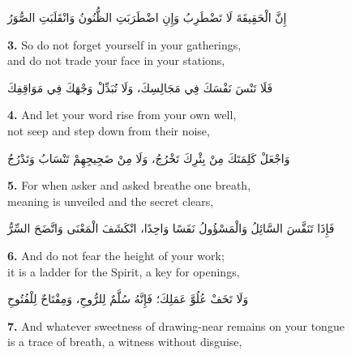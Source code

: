 \documentclass[11pt,a4paper,twoside]{book}
\begin{document}
\begin{flushright}
{\arabicfont
إِنَّ الْحَقِيقَةَ لَا تَضْطَرِبُ
وَإِنِ اضْطَرَبَتِ الظُّنُونُ وَانْقَلَبَتِ الصُّوَرُ}
\end{flushright}

\vspace{1em}
{\color{indigo}\bfseries 3.}\quad
So do not forget yourself in your gatherings,\\
and do not trade your face in your stations,

\begin{flushright}
{\arabicfont
فَلَا تَنْسَ نَفْسَكَ فِي مَجَالِسِكَ،
وَلَا تُبَدِّلْ وَجْهَكَ فِي مَوَاقِفِكَ}
\end{flushright}

\vspace{1em}
{\color{indigo}\bfseries 4.}\quad
And let your word rise from your own well,\\
not seep and step down from their noise,

\begin{flushright}
{\arabicfont
وَاجْعَلْ كَلِمَتَكَ مِنْ بِئْرِكَ تَخْرُجُ،
وَلَا مِنْ ضَجِيجِهِمْ تَنْسَابُ وَتَدْرُجُ}
\end{flushright}

\vspace{1em}
{\color{indigo}\bfseries 5.}\quad
For when asker and asked breathe one breath,\\
meaning is unveiled and the secret clears,

\begin{flushright}
{\arabicfont
فَإِذَا تَنَفَّسَ السَّائِلُ وَالْمَسْؤُولُ نَفَسًا وَاحِدًا،
انْكَشَفَ الْمَعْنَى وَاتَّضَحَ السِّرُّ}
\end{flushright}

\vspace{1em}
{\color{indigo}\bfseries 6.}\quad
And do not fear the height of your work;\\
it is a ladder for the Spirit, a key for openings,

\begin{flushright}
{\arabicfont
وَلَا تَخَفْ عُلُوَّ عَمَلِكَ؛
فَإِنَّهُ سُلَّمٌ لِلرُّوحِ، وَمِفْتَاحٌ لِلْفُتُوحِ}
\end{flushright}

\vspace{1em}
{\color{indigo}\bfseries 7.}\quad
And whatever sweetness of drawing-near remains on your tongue\\
is a trace of breath, a witness without disguise,
\end{document}
